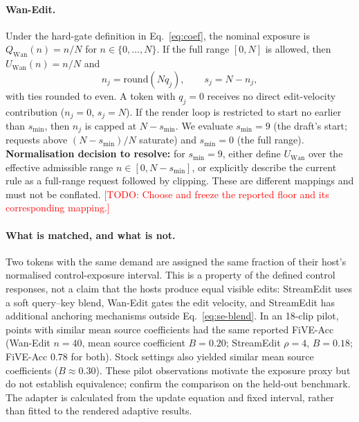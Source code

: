 \documentclass[10pt,twocolumn]{article}
\newcommand{\todo}[1]{\textcolor{red}{[TODO: #1]}}
\begin{document}
\paragraph{Wan-Edit.}
Under the hard-gate definition in Eq.~\eqref{eq:coef}, the nominal exposure is $Q_{\mathrm{Wan}}(n)=n/N$ for $n\in\{0,\dots,N\}$. If the full range $[0,N]$ is allowed, then $U_{\mathrm{Wan}}(n)=n/N$ and
\begin{equation}
n_j = \mathrm{round}(N q_j),\qquad s_j = N - n_j,
\end{equation}
with ties rounded to even. A token with $q_j=0$ receives no direct edit-velocity contribution ($n_j=0$, $s_j=N$). If the render loop is restricted to start no earlier than $s_{\min}$, then $n_j$ is capped at $N-s_{\min}$. We evaluate $s_{\min}=9$ (the draft's start; requests above $(N-s_{\min})/N$ saturate) and $s_{\min}=0$ (the full range). \textbf{Normalisation decision to resolve:} for $s_{\min}=9$, either define $U_{\mathrm{Wan}}$ over the effective admissible range $n\in[0,N-s_{\min}]$, or explicitly describe the current rule as a full-range request followed by clipping. These are different mappings and must not be conflated. \todo{Choose and freeze the reported floor and its corresponding mapping.}

\paragraph{What is matched, and what is not.}
Two tokens with the same demand are assigned the same fraction of their host's normalised control-exposure interval. This is a property of the defined control responses, not a claim that the hosts produce equal visible edits: StreamEdit uses a soft query--key blend, Wan-Edit gates the edit velocity, and StreamEdit has additional anchoring mechanisms outside Eq.~\eqref{eq:se-blend}. In an 18-clip pilot, points with similar mean source coefficients had the same reported FiVE-Acc (Wan-Edit $n=40$, mean source coefficient $B=0.20$; StreamEdit $\rho=4$, $B=0.18$; FiVE-Acc $0.78$ for both). Stock settings also yielded similar mean source coefficients ($B\approx0.30$). These pilot observations motivate the exposure proxy but do not establish equivalence; confirm the comparison on the held-out benchmark. The adapter is calculated from the update equation and fixed interval, rather than fitted to the rendered adaptive results.
\end{document}
